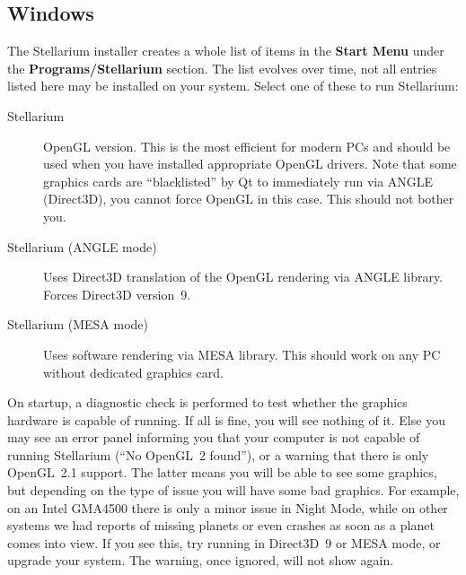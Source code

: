 \subsection{Windows}
\label{sec:GettingStarted:Running:Windows}

The Stellarium installer creates a whole list of items in the
\textbf{Start Menu} under the \textbf{Programs/Stellarium}
section. The list evolves over time, not all entries listed here 
may be installed on your system. Select one of these to run Stellarium:
\begin{description}
\item[Stellarium] OpenGL version. This is the most efficient for
  modern PCs and should be used when you have installed appropriate
  OpenGL drivers. Note that some graphics cards are ``blacklisted'' by
  Qt to immediately run via ANGLE (Direct3D), you cannot force OpenGL in this
  case. This should not bother you.
\item[Stellarium (ANGLE mode)] Uses Direct3D translation of the OpenGL
  rendering via ANGLE library.  Forces Direct3D version~9.
\item[Stellarium (MESA mode)] Uses software rendering via MESA
  library. This should work on any PC without dedicated graphics card.
\end{description}
On startup, a diagnostic check is performed to test whether the
graphics hardware is capable of running. If all is fine, you will see
nothing of it.  Else you may see an error panel informing you that
your computer is not capable of running Stellarium (``No OpenGL~2
found''), or a warning that there is only OpenGL~2.1 support. The
latter means you will be able to see some graphics, but depending on
the type of issue you will have some bad graphics. For example, on an
Intel GMA4500 there is only a minor issue in Night Mode, while on
other systems we had reports of missing planets or even crashes as
soon as a planet comes into view. If you see this, try running in
Direct3D~9 or MESA mode, or upgrade your system. The warning, once
ignored, will not show again.

